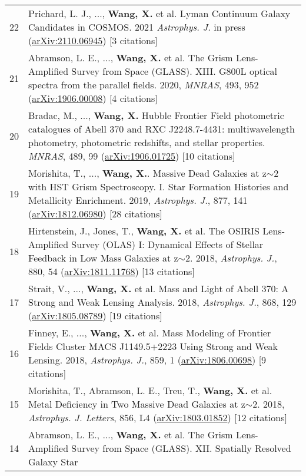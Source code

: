 \documentclass[letterpaper,10pt]{article}
\begin{document}
\begin{longtable}{rp{6.3in}}
22  &   Prichard, L. J., ..., \textbf{Wang, X.} et al. Lyman Continuum Galaxy Candidates in COSMOS. 2021 \textit{Astrophys. J.} in 
    press (\href{https://arxiv.org/abs/2110.06945}{arXiv:2110.06945}) [3 citations]  \\
21  &   Abramson, L. E., ..., \textbf{Wang, X.} et al. The Grism Lens-Amplified Survey from Space (GLASS). XIII. G800L optical spectra from the 
    parallel fields. 2020, \textit{MNRAS}, 493, 952 (\href{https://arxiv.org/abs/1906.00008}{arXiv:1906.00008}) [4 citations]  \\
20  &   Bradac, M., ..., \textbf{Wang, X.} Hubble Frontier Field photometric catalogues of Abell 370 and RXC J2248.7-4431: 
    multiwavelength photometry, photometric redshifts, and stellar properties. \textit{MNRAS}, 489, 99 
    (\href{https://arxiv.org/abs/1906.01725}{arXiv:1906.01725}) [10 citations]  \\
19  &   Morishita, T., ..., \textbf{Wang, X.}. Massive Dead Galaxies at z$\sim$2 with HST Grism Spectroscopy. I. Star Formation Histories and 
    Metallicity Enrichment. 2019, \textit{Astrophys. J.}, 877, 141 (\href{https://arxiv.org/abs/1812.06980}{arXiv:1812.06980}) [28 citations] \\
18  &   Hirtenstein, J., Jones, T., \textbf{Wang, X.} et al. The OSIRIS Lens-Amplified Survey (OLAS) I: Dynamical Effects of Stellar Feedback in Low 
    Mass Galaxies at z$\sim$2. 2018, \textit{Astrophys. J.}, 880, 54 (\href{https://arxiv.org/abs/1811.11768}{arXiv:1811.11768}) 
    [13 citations] \\
17  &   Strait, V., ..., \textbf{Wang, X.} et al. Mass and Light of Abell 370: A Strong and Weak Lensing Analysis. 2018, \textit{Astrophys. J.}, 868, 
    129 (\href{https://arxiv.org/abs/1805.08789}{arXiv:1805.08789}) [19 citations] \\
16  &   Finney, E., ..., \textbf{Wang, X.} et al. Mass Modeling of Frontier Fields Cluster MACS J1149.5+2223 Using Strong and Weak Lensing. 2018, 
    \textit{Astrophys. J.}, 859, 1 (\href{https://arxiv.org/abs/1806.00698}{arXiv:1806.00698}) [9 citations] \\
15  &   Morishita, T., Abramson, L. E., Treu, T., \textbf{Wang, X.} et al.  Metal Deficiency in Two Massive Dead Galaxies at z$\sim$2. 2018, 
    \textit{Astrophys. J. Letters}, 856, L4 (\href{https://arxiv.org/abs/1803.01852}{arXiv:1803.01852}) [12 citations]  \\
14  &   Abramson, L. E., ..., \textbf{Wang, X.} et al. The Grism Lens-Amplified Survey from Space (GLASS). XII. Spatially Resolved Galaxy Star 

\end{longtable}
\end{document}
